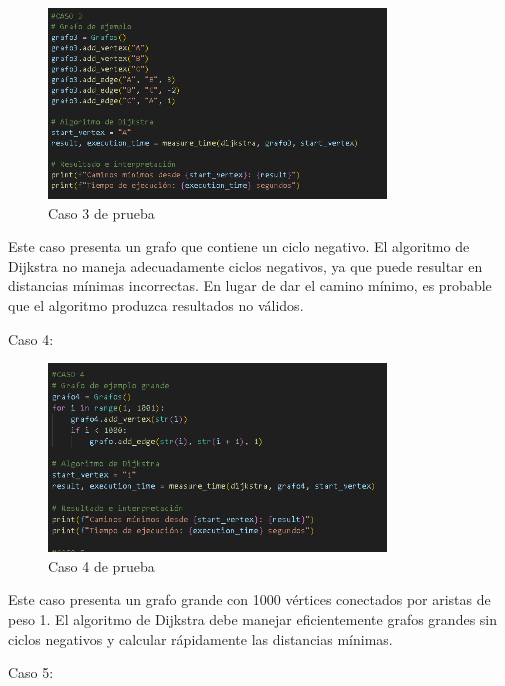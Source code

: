 \documentclass{article}
\begin{document}
\begin{figure}[H]
    \centering
    \includegraphics[width=0.8\textwidth]{figura_6_caso_3.PNG}
    \caption{Caso 3 de prueba}
    \label{figura 6}
\end{figure}
Este caso presenta un grafo que contiene un ciclo negativo. 
El algoritmo de Dijkstra no maneja adecuadamente ciclos negativos, 
ya que puede resultar en distancias mínimas incorrectas. En lugar de dar 
el camino mínimo, es probable que el algoritmo produzca resultados no válidos.

Caso 4:

\begin{figure}[H]
    \centering
    \includegraphics[width=0.8\textwidth]{figura_7_caso_4.PNG}
    \caption{Caso 4 de prueba}
    \label{figura 7}
\end{figure}
Este caso presenta un grafo grande con 1000 vértices 
conectados por aristas de peso 1. El algoritmo de Dijkstra debe manejar 
eficientemente grafos grandes sin ciclos negativos y calcular rápidamente 
las distancias mínimas.

Caso 5:
\end{document}
